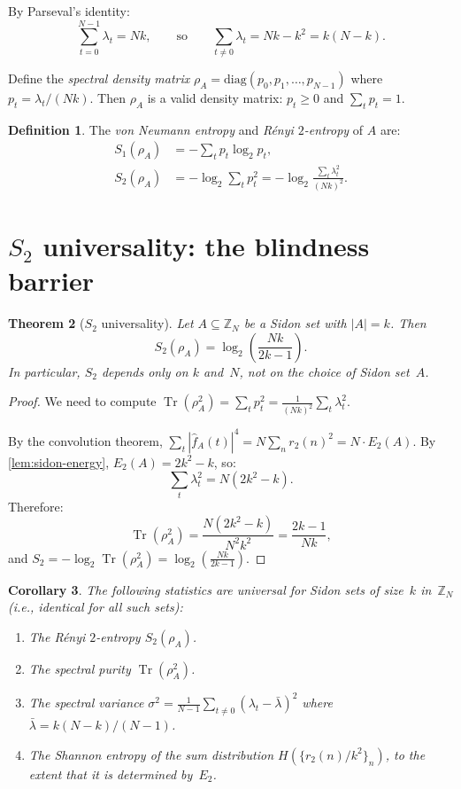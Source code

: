\documentclass[11pt]{article}
\newtheorem{theorem}{Theorem}[section]
\newtheorem{corollary}[theorem]{Corollary}
\theoremstyle{definition}
\newtheorem{definition}[theorem]{Definition}
\theoremstyle{remark}
\newcommand{\Z}{\mathbb{Z}}
\newcommand{\fhat}{\widehat{f}}
\newcommand{\Tr}{\operatorname{Tr}}
\begin{document}
By Parseval's identity:
\begin{equation}\label{eq:parseval}
  \sum_{t=0}^{N-1} \lambda_t = Nk,
  \qquad\text{so}\qquad
  \sum_{t \ne 0} \lambda_t = Nk - k^2 = k(N - k).
\end{equation}

Define the \emph{spectral density matrix}
$\rho_A = \text{diag}(p_0, p_1, \ldots, p_{N-1})$ where
$p_t = \lambda_t / (Nk)$.  Then $\rho_A$ is a valid density matrix:
$p_t \ge 0$ and $\sum_t p_t = 1$.

\begin{definition}\label{def:entropies}
The \emph{von Neumann entropy} and \emph{R\'enyi $2$-entropy} of $A$
are:
\begin{align*}
  S_1(\rho_A) &= -\sum_{t} p_t \log_2 p_t, \\
  S_2(\rho_A) &= -\log_2 \sum_{t} p_t^2
  = -\log_2 \frac{\sum_t \lambda_t^2}{(Nk)^2}.
\end{align*}
\end{definition}

\section{$S_2$ universality: the blindness barrier}\label{sec:S2}

\begin{theorem}[$S_2$ universality]\label{thm:S2-universal}
Let $A \subseteq \Z_N$ be a Sidon set with $|A| = k$.  Then
\[
  S_2(\rho_A) = \log_2\!\left(\frac{Nk}{2k - 1}\right).
\]
In particular, $S_2$ depends only on $k$ and~$N$, not on the choice
of Sidon set~$A$.
\end{theorem}

\begin{proof}
We need to compute $\Tr(\rho_A^2) = \sum_t p_t^2 =
\frac{1}{(Nk)^2} \sum_t \lambda_t^2$.

By the convolution theorem,
$\sum_t |\fhat_A(t)|^4 = N \sum_n r_2(n)^2 = N \cdot E_2(A)$.
By \cref{lem:sidon-energy}, $E_2(A) = 2k^2 - k$, so:
\[
  \sum_t \lambda_t^2 = N(2k^2 - k).
\]
Therefore:
\[
  \Tr(\rho_A^2) = \frac{N(2k^2 - k)}{N^2 k^2}
  = \frac{2k - 1}{Nk},
\]
and $S_2 = -\log_2 \Tr(\rho_A^2) = \log_2\!\left(\frac{Nk}{2k-1}\right)$.
\end{proof}

\begin{corollary}\label{cor:blind}
The following statistics are \emph{universal} for Sidon sets of size~$k$
in~$\Z_N$ (i.e., identical for all such sets):
\begin{enumerate}[label=(\alph*)]
\item The R\'enyi $2$-entropy $S_2(\rho_A)$.
\item The spectral purity $\Tr(\rho_A^2)$.
\item The spectral variance
$\sigma^2 = \frac{1}{N-1}\sum_{t \ne 0}(\lambda_t - \bar\lambda)^2$
where $\bar\lambda = k(N-k)/(N-1)$.
\item The Shannon entropy of the sum distribution
$H(\{r_2(n)/k^2\}_n)$, to the extent that it is determined by~$E_2$.
\end{enumerate}
\end{corollary}
\end{document}

